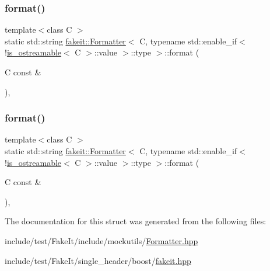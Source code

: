 \subsubsection{\texorpdfstring{format()}{format()}\hspace{0.1cm}{\footnotesize\ttfamily [8/9]}}
{\footnotesize\ttfamily template$<$class C $>$ \\
static std\+::string \mbox{\hyperlink{structfakeit_1_1Formatter}{fakeit\+::\+Formatter}}$<$ C, typename std\+::enable\+\_\+if$<$!\mbox{\hyperlink{classfakeit_1_1is__ostreamable}{is\+\_\+ostreamable}}$<$ C $>$\+::value $>$\+::type $>$\+::format (\begin{DoxyParamCaption}\item[{C const \&}]{ }\end{DoxyParamCaption})\hspace{0.3cm}{\ttfamily [inline]}, {\ttfamily [static]}}

\mbox{\label{structfakeit_1_1Formatter_3_01C_00_01typename_01std_1_1enable__if_3_9is__ostreamable_3_01C_01_4_1_1value_01_4_1_1type_01_4_a4dba58e2321b020a9ac60d5e132afbb0}} 
\subsubsection{\texorpdfstring{format()}{format()}\hspace{0.1cm}{\footnotesize\ttfamily [9/9]}}
{\footnotesize\ttfamily template$<$class C $>$ \\
static std\+::string \mbox{\hyperlink{structfakeit_1_1Formatter}{fakeit\+::\+Formatter}}$<$ C, typename std\+::enable\+\_\+if$<$!\mbox{\hyperlink{classfakeit_1_1is__ostreamable}{is\+\_\+ostreamable}}$<$ C $>$\+::value $>$\+::type $>$\+::format (\begin{DoxyParamCaption}\item[{C const \&}]{ }\end{DoxyParamCaption})\hspace{0.3cm}{\ttfamily [inline]}, {\ttfamily [static]}}



The documentation for this struct was generated from the following files\+:\begin{DoxyCompactItemize}
\item 
include/test/\+Fake\+It/include/mockutils/\mbox{\hyperlink{Formatter_8hpp}{Formatter.\+hpp}}\item 
include/test/\+Fake\+It/single\+\_\+header/boost/\mbox{\hyperlink{single__header_2boost_2fakeit_8hpp}{fakeit.\+hpp}}\end{DoxyCompactItemize}

